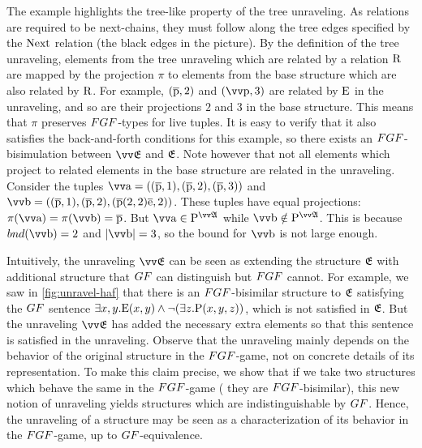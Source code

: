 \noindent
The example highlights the tree-like property of the tree unraveling.
As relations are required to be next-chains, they must follow along the tree edges specified by the $\mathrm{Next}$ relation (the black edges in the picture).
By the definition of the tree unraveling, elements from the tree unraveling which are related by a relation $\mathrm{R}$ are mapped by the projection $\pi$ to elements from the base structure which are also related by $\mathrm{R}$.
For example, $(\overline{\mathrm{p}}, 2)$ and $(\elemtuptuplep, 3)$ are related by $\mathrm{E}$ in the unraveling, and so are their projections $2$ and $3$ in the base structure.
This means that $\pi$ preserves $\FGF$-types for live tuples.
It is easy to verify that it also satisfies the back-and-forth conditions for this example, so there exists an $\FGF$-bisimulation between $\unravel{E}$ and ${\mathfrak{E}}$.
Note however that not all elements which project to related elements in the base structure are related in the unraveling.
Consider the tuples $\elemtuptuplea = ((\elemtuplep, 1), (\elemtuplep, 2), (\elemtuplep, 3))$ and $\elemtuptupleb = ((\elemtuplep, 1), (\elemtuplep, 2), (\elemtuplep(2,2)\elemtuplee, 2))$.
These tuples have equal projections: $\pi(\elemtuptuplea) = \pi(\elemtuptupleb) = \elemtuplep$.
But $\elemtuptuplea \in \relP^{\unravel{A}}$ while $\elemtuptupleb \notin \relP^{\unravel{A}}$.
This is because $\bound{\elemtuptupleb} = 2$ and $|\elemtuptupleb| = 3$, so the bound for $\elemtuptupleb$ is not large enough.

Intuitively, the unraveling $\unravel{E}$ can be seen as extending the structure ${\mathfrak{E}}$ with additional structure that $\GF$ can distinguish but $\FGF$ cannot.
For example, we saw in \cref{fig:unravel-haf} that there is an $\FGF$-bisimilar structure to ${\mathfrak{E}}$ satisfying the $\GF$ sentence $\exists{x,y}. \mathrm{E}(x,y) \land \lnot (\exists z. \mathrm{P}(x,y,z))$, which is not satisfied in ${\mathfrak{E}}$.
But the unraveling $\unravel{E}$ has added the necessary extra elements so that this sentence is satisfied in the unraveling.
Observe that the unraveling mainly depends on the behavior of the original structure in the $\FGF$-game, not on concrete details of its representation.
To make this claim precise, we show that if we take two structures which behave the same in the $\FGF$-game (\ie{} they are $\FGF$-bisimilar), this new notion of unraveling yields structures which are indistinguishable by $\GF$.
Hence, the unraveling of a structure may be seen as a characterization of its behavior in the $\FGF$-game, up to $\GF$-equivalence.

